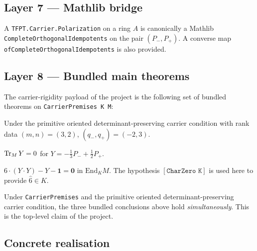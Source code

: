 \documentclass[11pt,a4paper]{article}
\begin{document}
\subsection*{Layer 7 --- Mathlib bridge}

\begin{theorem}
A \texttt{TFPT.Carrier.Polarization} on a ring $A$ is canonically
a Mathlib \texttt{CompleteOrthogonalIdempotents} on the pair
$(P_-, P_+)$. A converse map
\texttt{ofCompleteOrthogonalIdempotents} is also provided.
\end{theorem}

\subsection*{Layer 8 --- Bundled main theorems}

The carrier-rigidity payload of the project is the following set
of bundled theorems on
\texttt{CarrierPremises K M}:

\begin{theorem}
Under the primitive oriented determinant-preserving carrier
condition with rank data $(m, n) = (3, 2)$, $(q_-, q_+) = (-2, 3)$.
\end{theorem}

\begin{theorem}
$\operatorname{Tr}_M Y = 0$ for $Y = -\tfrac13 P_- + \tfrac12 P_+$.
\end{theorem}

\begin{theorem}
$6\cdot(Y\cdot Y) - Y - \mathbf 1 = \mathbf 0$ in $\mathrm{End}_K M$.
The hypothesis $[\texttt{CharZero K}]$ is used here to provide
$\widehat 6 \in K$.
\end{theorem}

\begin{theorem}
Under \texttt{CarrierPremises} and the primitive oriented
determinant-preserving carrier condition, the three bundled
conclusions above hold \emph{simultaneously}. This is the
top-level claim of the project.
\end{theorem}

\subsection*{Concrete realisation}
\end{document}
